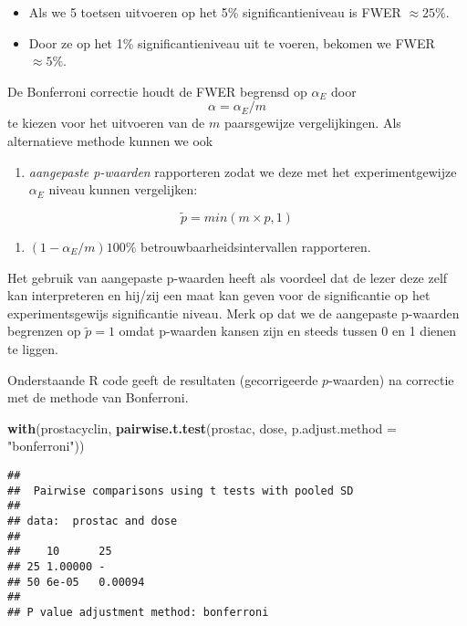 \documentclass[
  12pt,dutch,coursenotes]{book}
\newenvironment{Shaded}{\begin{snugshade}}{\end{snugshade}}
\newcommand{\DataTypeTok}[1]{\textcolor[rgb]{0.13,0.29,0.53}{#1}}
\newcommand{\KeywordTok}[1]{\textcolor[rgb]{0.13,0.29,0.53}{\textbf{#1}}}
\newcommand{\NormalTok}[1]{#1}
\newcommand{\StringTok}[1]{\textcolor[rgb]{0.31,0.60,0.02}{#1}}
\providecommand{\tightlist}{%
  \setlength{\itemsep}{0pt}\setlength{\parskip}{0pt}}
\theoremstyle{definition}
\theoremstyle{definition}
\theoremstyle{definition}
\theoremstyle{remark}
\begin{document}
\begin{itemize}
\tightlist
\item
  Als we 5 toetsen uitvoeren op het 5\% significantieniveau is FWER \(\approx 25\%\).
\item
  Door ze op het 1\% significantieniveau uit te voeren, bekomen we FWER \(\approx 5\%\).
\end{itemize}

De Bonferroni correctie houdt de FWER begrensd op \(\alpha_E\) door \[\alpha=\alpha_E/m\] te kiezen voor het uitvoeren van de \(m\) paarsgewijze vergelijkingen.
Als alternatieve methode kunnen we ook

\begin{enumerate}
\def\labelenumi{\arabic{enumi}.}
\tightlist
\item
  \emph{aangepaste p-waarden} rapporteren zodat we deze met het experimentgewijze \(\alpha_E\) niveau kunnen vergelijken:
\end{enumerate}

\[\tilde{p}=min(m\times p,1)\]

\begin{enumerate}
\def\labelenumi{\arabic{enumi}.}
\setcounter{enumi}{1}
\tightlist
\item
  \((1-\alpha_E/m)100\%\) betrouwbaarheidsintervallen rapporteren.
\end{enumerate}

Het gebruik van aangepaste p-waarden heeft als voordeel dat de lezer deze zelf kan interpreteren en hij/zij een maat kan geven voor de significantie op het experimentsgewijs significantie niveau.
Merk op dat we de aangepaste p-waarden begrenzen op \(\tilde{p}=1\) omdat p-waarden kansen zijn en steeds tussen 0 en 1 dienen te liggen.

Onderstaande R code geeft de resultaten (gecorrigeerde \(p\)-waarden) na correctie met de methode van Bonferroni.

\begin{Shaded}
\begin{Highlighting}[]
\KeywordTok{with}\NormalTok{(prostacyclin, }\KeywordTok{pairwise.t.test}\NormalTok{(prostac, dose, }\DataTypeTok{p.adjust.method =} \StringTok{"bonferroni"}\NormalTok{))}
\end{Highlighting}
\end{Shaded}

\begin{verbatim}
## 
##  Pairwise comparisons using t tests with pooled SD 
## 
## data:  prostac and dose 
## 
##    10      25     
## 25 1.00000 -      
## 50 6e-05   0.00094
## 
## P value adjustment method: bonferroni
\end{verbatim}
\end{document}
